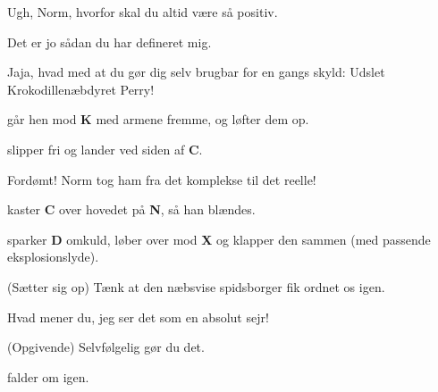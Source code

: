 \documentclass[a4paper,11pt]{article}
\begin{document}
\begin{sketch}
 Ugh, Norm, hvorfor skal du altid være så positiv.

 Det er jo sådan du har defineret mig.

 Jaja, hvad med at du gør dig selv brugbar for en gangs skyld: Udslet Krokodillenæbdyret Perry!

 går hen mod \textbf{K} med armene fremme, og løfter dem op.

 slipper fri og lander ved siden af \textbf{C}.

 Fordømt! Norm tog ham fra det komplekse til det reelle!


 kaster \textbf{C} over hovedet på \textbf{N}, så han blændes.

 sparker \textbf{D} omkuld, løber over mod \textbf{X} og klapper den sammen (med passende eksplosionslyde).


 (Sætter sig op) Tænk at den næbsvise spidsborger fik ordnet os igen.

 Hvad mener du, jeg ser det som en absolut sejr!

 (Opgivende) Selvfølgelig gør du det.

 falder om igen.

\end{sketch}
\end{document}
